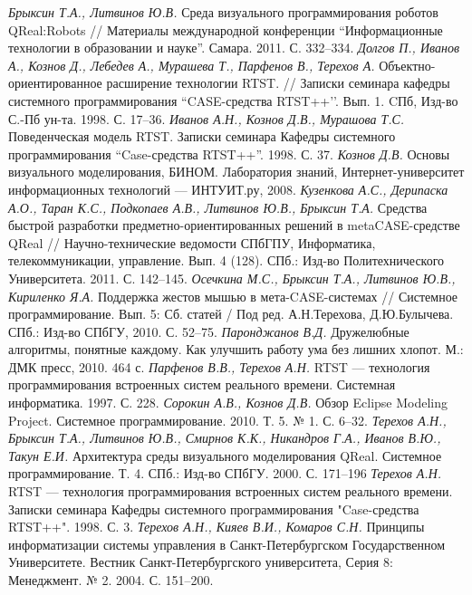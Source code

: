 \documentclass[a4]{article}
\begin{document}
\begin{thebibliography}{9001}
 \emph{Брыксин Т.А., Литвинов Ю.В.} Среда визуального программирования роботов QReal:Robots // Материалы международной конференции ``Информационные технологии в образовании и науке''. Самара. 2011. С. 332--334.
 \emph{Долгов П., Иванов А., Кознов Д., Лебедев А., Мурашева Т., Парфенов В., Терехов А.} Объектно-ориентированное расширение технологии RTST. // Записки семинара кафедры системного программирования ``CASE-средства RTST++’’. Вып. 1. CПб, Изд-во С.-Пб ун-та. 1998. С. 17--36.
 \emph{Иванов А.Н., Кознов Д.В., Мурашова Т.С.} Поведенческая модель RTST. Записки семинара Кафедры системного программирования ``Case-средства RTST++''. 1998. С. 37.
 \emph{Кознов Д.В.} Основы визуального моделирования, БИНОМ. Лаборатория знаний, Интернет-университет информационных технологий --- ИНТУИТ.ру, 2008.
 \emph{Кузенкова А.С., Дерипаска А.О., Таран К.С., Подкопаев А.В., Литвинов Ю.В., Брыксин Т.А.} Средства быстрой разработки предметно-ориентированных решений в metaCASE-средстве QReal // Научно-технические ведомости СПбГПУ, Информатика, телекоммуникации, управление. Вып. 4 (128). СПб.: Изд-во Политехнического Университета. 2011. С. 142--145.
 \emph{Осечкина М.С., Брыксин Т.А., Литвинов Ю.В., Кириленко Я.А.} Поддержка жестов мышью в мета-CASE-системах // Системное программирование. Вып. 5: Сб. статей / Под ред. А.Н.Терехова, Д.Ю.Булычева.  СПб.: Изд-во СПбГУ, 2010. С. 52--75.
 \emph{Паронджанов В.Д.} Дружелюбные алгоритмы, понятные каждому. Как улучшить работу ума без лишних хлопот. М.: ДМК пресс, 2010. 464 с.
 \emph{Парфенов В.В., Терехов А.Н.} RTST --- технология программирования встроенных систем реального времени. Системная информатика. 1997. С. 228.
 \emph{Сорокин А.В., Кознов Д.В.} Обзор Eclipse Modeling Project. Системное программирование. 2010. Т. 5. № 1. С. 6--32. 
 \emph{Терехов А.Н., Брыксин Т.А., Литвинов Ю.В., Смирнов К.К., Никандров Г.А., Иванов В.Ю., Такун Е.И.} Архитектура среды визуального моделирования QReal. Системное программирование. Т. 4.  СПб.: Изд-во СПбГУ. 2000. С. 171--196
 \emph{Терехов А.Н.} RTST --- технология программирования встроенных систем реального времени. Записки семинара Кафедры системного программирования "Case-средства RTST++". 1998. С. 3.
 \emph{Терехов А.Н., Кияев В.И., Комаров С.Н.} Принципы информатизации системы управления в Санкт-Петербургском Государственном Университете. Вестник Санкт-Петербургского университета, Серия 8: Менеджмент. № 2. 2004. С. 151--200.

\end{thebibliography}
\end{document}

